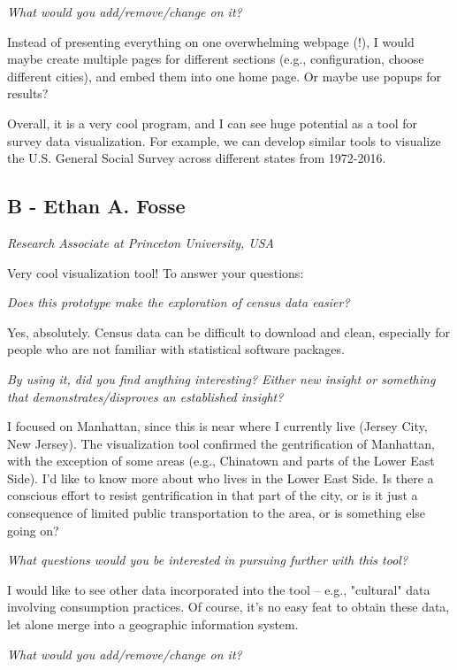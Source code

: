 \documentclass[a4paper]{article}
\newcommand{\question}[1]{\smallskip\noindent\emph{#1}}
\begin{document}
 
\question{What would you add/remove/change on it?}
 

Instead of presenting everything on one overwhelming webpage (!), I would maybe
create multiple pages for different sections (e.g., configuration, choose
different cities), and embed them into one home page. Or maybe use popups for
results?
 
 
Overall, it is a very cool program, and I can see huge potential as a tool for
survey data visualization. For example, we can develop similar tools to
visualize the U.S. General Social Survey across different states from 1972-2016.


\subsection{B - Ethan A. Fosse}
\emph{Research Associate at Princeton University, USA}

Very cool visualization tool! To answer your questions:

\question{Does this prototype make the exploration of census data easier?}

Yes, absolutely. Census data can be difficult to download and clean, especially
for people who are not familiar with statistical software packages.

\question{By using it, did you find anything interesting? Either new insight or
something that demonstrates/disproves an established insight?}

I focused on Manhattan, since this is near where I currently live (Jersey City,
New Jersey). The visualization tool confirmed the gentrification of Manhattan,
with the exception of some areas (e.g., Chinatown and parts of the Lower East
Side). I'd like to know more about who lives in the Lower East Side. Is there a
conscious effort to resist gentrification in that part of the city, or is it
just a consequence of limited public transportation to the area, or is something
else going on?
 
\question{What questions would you be interested in pursuing further with this tool? }

I would like to see other data incorporated into the tool -- e.g., "cultural"
data involving consumption practices. Of course, it's no easy feat to obtain
these data, let alone merge into a geographic information system.

\question{What would you add/remove/change on it?}
\end{document}
